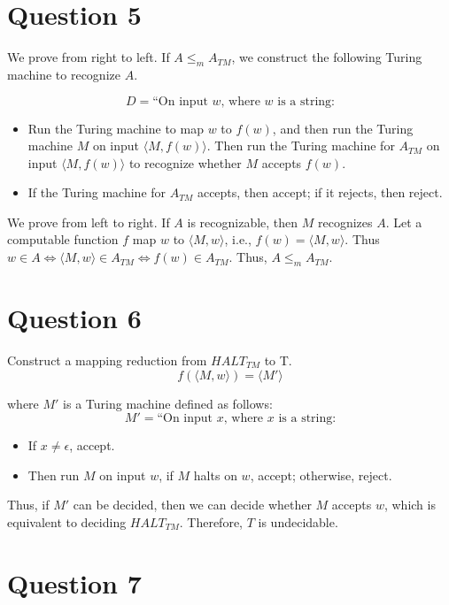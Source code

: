 \documentclass[a4paper, UTF-8]{article}
\theoremstyle{plain}
\begin{document}
\section{Question 5} 

We prove from right to left. If $A \leq_m A_{TM}$, we construct the following Turing machine to recognize $A$.

$$
D = \text{``On input } w\text{, where } w \text{ is a string:}
$$

\begin{itemize}
  \item Run the Turing machine to map $w$ to $f(w)$, and then run the Turing machine $M$ on input $\langle M, f(w) \rangle$. Then run the Turing machine for $A_{TM}$ on input $\langle M, f(w) \rangle$ to recognize whether $M$ accepts $f(w)$.
  \item If the Turing machine for $A_{TM}$ accepts, then accept; if it rejects, then reject.
\end{itemize} 

We prove from left to right. If $A$ is recognizable, then $M$ recognizes $A$. Let a computable function $f$ map $w$ to $\langle M, w \rangle$, i.e., $f(w) = \langle M, w \rangle$. Thus $w \in A \iff \langle M, w \rangle \in A_{TM} \iff f(w) \in A_{TM}$. Thus, $A \leq_m A_{TM}$.

\section{Question 6} 

Construct a mapping reduction from $HALT_{TM}$ to T. 
$$
f(\langle M, w \rangle) = \langle M' \rangle
$$ 

where $M'$ is a Turing machine defined as follows:
$$
M' = \text{``On input } x \text{, where } x \text{ is a string:}
$$
\begin{itemize}
  \item If $x \ne \epsilon$, accept.
  \item Then run $M$ on input $w$, if $M$ halts on $w$, accept; otherwise, reject.
\end{itemize}

Thus, if $M'$ can be decided, then we can decide whether $M$ accepts $w$, which is equivalent to deciding $HALT_{TM}$. Therefore, $T$ is undecidable.

\section{Question 7} 
\end{document}
